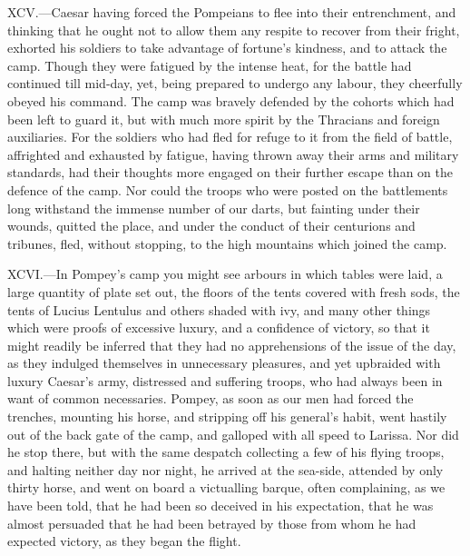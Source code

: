 XCV.—Caesar having forced the Pompeians to flee into their
entrenchment, and thinking that he ought not to allow them any respite
to recover from their fright, exhorted his soldiers to take advantage of
fortune's kindness, and to attack the camp. Though they were fatigued by
the intense heat, for the battle had continued till mid-day, yet, being
prepared to undergo any labour, they cheerfully obeyed his command. The
camp was bravely defended by the cohorts which had been left to guard
it, but with much more spirit by the Thracians and foreign auxiliaries.
For the soldiers who had fled for refuge to it from the field of battle,
affrighted and exhausted by fatigue, having thrown away their arms and
military standards, had their thoughts more engaged on their further
escape than on the defence of the camp. Nor could the troops who were
posted on the battlements long withstand the immense number of our
darts, but fainting under their wounds, quitted the place, and under the
conduct of their centurions and tribunes, fled, without stopping, to the
high mountains which joined the camp.

XCVI.—In Pompey's camp you might see arbours in which tables were laid,
a large quantity of plate set out, the floors of the tents covered with
fresh sods, the tents of Lucius Lentulus and others shaded with ivy, and
many other things which were proofs of excessive luxury, and a
confidence of victory, so that it might readily be inferred that they
had no apprehensions of the issue of the day, as they indulged
themselves in unnecessary pleasures, and yet upbraided with luxury
Caesar's army, distressed and suffering troops, who had always been in
want of common necessaries. Pompey, as soon as our men had forced the
trenches, mounting his horse, and stripping off his general's habit,
went hastily out of the back gate of the camp, and galloped with all
speed to Larissa. Nor did he stop there, but with the same despatch
collecting a few of his flying troops, and halting neither day nor
night, he arrived at the sea-side, attended by only thirty horse, and
went on board a victualling barque, often complaining, as we have been
told, that he had been so deceived in his expectation, that he was
almost persuaded that he had been betrayed by those from whom he had
expected victory, as they began the flight.

